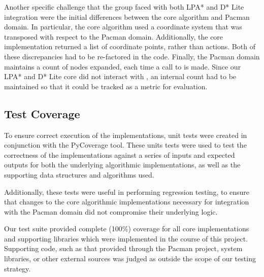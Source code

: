 	Another specific challenge that the group faced with both LPA* and D* Lite integration were the initial differences between the core algorithm and Pacman domain. In particular, the core algorithm used a coordinate system that was transposed with respect to the Pacman domain. Additionally, the core implementation returned a list of coordinate points, rather than actions. Both of these discrepancies had to be re-factored in the code. Finally, the Pacman domain maintains a count of nodes expanded, each time a call to  is made. Since our LPA* and D* Lite core did not interact with , an internal count had to be maintained so that it could be tracked as a metric for evaluation. 

\subsection{Test Coverage}

	To ensure correct execution of the implementations, unit tests were created in conjunction with the PyCoverage tool. These units tests were used to test the correctness of the implementations against a series of inputs and expected outputs for both the underlying algorithmic implementations, as well as the supporting data structures and algorithms used.
	
	Additionally, these tests were useful in performing regression testing, to ensure that changes to the core algorithmic implementations necessary for integration with the Pacman domain did not compromise their underlying logic.
	
	Our test suite provided complete (100\%) coverage for all core implementations and supporting libraries which were implemented in the course of this project. Supporting code, such as that provided through the Pacman project, system libraries, or other external sources was judged as outside the scope of our testing strategy.



